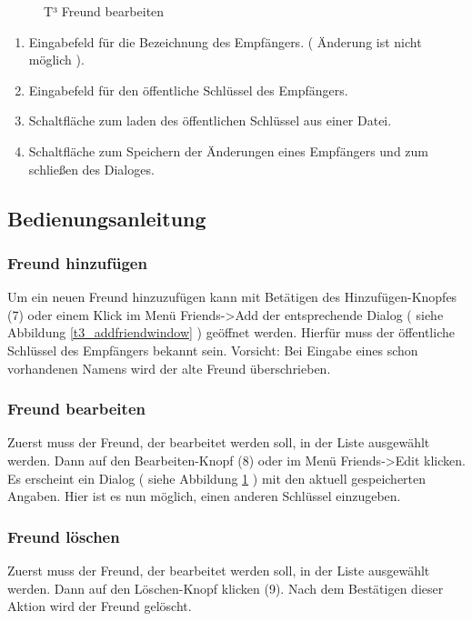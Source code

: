 \documentclass[12pt,a4paper,titlepage]{article}
\begin{document}
\begin{figure}[ht]
  \centering
  \caption{T³ Freund bearbeiten}
  \label{t3_editfriendwindow}
\end{figure}
\begin{enumerate}
\item Eingabefeld für die Bezeichnung des Empfängers. ( Änderung ist nicht möglich ).
\item Eingabefeld für den öffentliche Schlüssel des Empfängers.
\item Schaltfläche zum laden des öffentlichen Schlüssel aus einer Datei.
\item Schaltfläche zum Speichern der Änderungen eines Empfängers und zum schließen des Dialoges.
\end{enumerate}
\newpage
\subsection{Bedienungsanleitung}
\subsubsection{Freund hinzufügen}
Um ein neuen Freund hinzuzufügen kann mit Betätigen des Hinzufügen-Knopfes (7) oder einem Klick im Menü Friends->Add der entsprechende Dialog ( siehe Abbildung \ref{t3_addfriendwindow} ) geöffnet werden. Hierfür muss der öffentliche Schlüssel des Empfängers bekannt sein.
Vorsicht: Bei Eingabe eines schon vorhandenen Namens wird der alte Freund überschrieben. 
\subsubsection{Freund bearbeiten}
Zuerst muss der Freund, der bearbeitet werden soll, in der Liste ausgewählt werden. Dann auf den Bearbeiten-Knopf (8) oder im Menü Friends->Edit klicken. Es erscheint ein Dialog ( siehe Abbildung \ref{t3_editfriendwindow} ) mit den aktuell gespeicherten Angaben. Hier ist es nun möglich, einen anderen Schlüssel einzugeben.
\subsubsection{Freund löschen}
Zuerst muss der Freund, der bearbeitet werden soll, in der Liste ausgewählt werden. Dann auf den Löschen-Knopf klicken (9). Nach dem Bestätigen dieser Aktion wird der Freund gelöscht.
\end{document}
